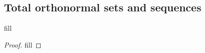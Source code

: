 \subsection{Total orthonormal sets and sequences}

\begin{exercise}{1}
fill
\end{exercise}
\begin{proof}
fill
\end{proof}